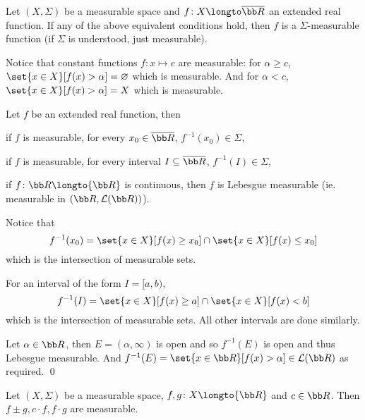 \bdefn

    Let $(X,\Sigma)$ be a measurable space and $f\colon X\longto\overline{\bb R}$ an extended real function.
    If any of the above equivalent conditions hold, then $f$ is a {\emphcolor $\Sigma$-measurable function} (if $\Sigma$ is understood, just measurable).

\edefn

Notice that constant functions $f\colon x\mapsto c$ are measurable: for $\alpha\geq c$, $\set{x\in X}[f(x)>\alpha]=\varnothing$ which is measurable.
And for $\alpha<c$, $\set{x\in X}[f(x)>\alpha]=X$ which is measurable.

\bcoro

    Let $f$ be an extended real function, then
    \benum
        \item if $f$ is measurable, for every $x_0\in\overline{\bb R}$, $f^{-1}(x_0)\in\Sigma$,
        \item if $f$ is measurable, for every interval $I\subseteq\overline{\bb R}$, $f^{-1}(I)\in\Sigma$,
        \item if $f\colon{\bb R}\longto{\bb R}$ is continuous, then $f$ is Lebesgue measurable (ie. measurable in $({\bb R},{\cal L}({\bb R}))$).
    \eenum

\ecoro

\Proof
\benum
    \item Notice that
        $$ f^{-1}(x_0) = \set{x\in X}[f(x)\geq x_0]\cap\set{x\in X}[f(x)\leq x_0] $$
        which is the intersection of measurable sets.
    \item For an interval of the form $I=[a,b)$,
        $$ f^{-1}(I) = \set{x\in X}[f(x)\geq a]\cap\set{x\in X}[f(x)<b] $$
        which is the intersection of measurable sets.
        All other intervals are done similarly.
    \item Let $\alpha\in{\bb R}$, then $E=(\alpha,\infty)$ is open and so $f^{-1}(E)$ is open and thus Lebesgue measurable.
        And $f^{-1}(E)=\set{x\in{\bb R}}[f(x)>\alpha]\in{\cal L}({\bb R})$ as required.
        \qed
\eenum

\bthrm

    Let $(X,\Sigma)$ be a measurable space, $f,g\colon X\longto{\bb R}$ and $c\in{\bb R}$.
    Then $f\pm g,c\cdot f,f\cdot g$ are measurable.

\ethrm

